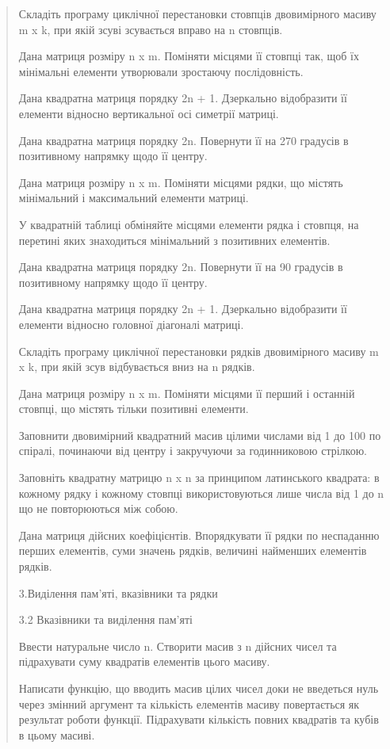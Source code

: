 \documentclass[]{article}
\begin{document}
\begin{quote}
Складіть програму циклічної перестановки стовпців двовимірного масиву m
x k, при якій зсуві зсувається вправо на n стовпців.

Дана матриця розміру n x m. Поміняти місцями її стовпці так, щоб їх
мінімальні елементи утворювали зростаючу послідовність.

Дана квадратна матриця порядку 2n + 1. Дзеркально відобразити її
елементи відносно вертикальної осі симетрії матриці.

Дана квадратна матриця порядку 2n. Повернути її на 270 градусів в
позитивному напрямку щодо її центру.

Дана матриця розміру n x m. Поміняти місцями рядки, що містять
мінімальний і максимальний елементи матриці.

У квадратній таблиці обміняйте місцями елементи рядка і стовпця, на
перетині яких знаходиться мінімальний з позитивних елементів.

Дана квадратна матриця порядку 2n. Повернути її на 90 градусів в
позитивному напрямку щодо її центру.

Дана квадратна матриця порядку 2n + 1. Дзеркально відобразити її
елементи відносно головної діагоналі матриці.

Складіть програму циклічної перестановки рядків двовимірного масиву m x
k, при якій зсув відбувається вниз на n рядків.

Дана матриця розміру n x m. Поміняти місцями її перший і останній
стовпці, що містять тільки позитивні елементи.

Заповнити двовимірний квадратний масив цілими числами від 1 до 100 по
спіралі, починаючи від центру і закручуючи за годинниковою стрілкою.

Заповніть квадратну матрицю n x n за принципом латинського квадрата: в
кожному рядку і кожному стовпці використовуються лише числа від 1 до n
що не повторюються між собою.

Дана матриця дійсних коефіцієнтів. Впорядкувати її рядки по неспаданню
перших елементів, суми значень рядків, величині найменших елементів
рядків.

3.Виділення пам'яті, вказівники та рядки

3.2 Вказівники та виділення пам'яті

Ввести натуральне число n. Створити масив з n дійсних чисел та
підрахувати суму квадратів елементів цього масиву.

Написати функцію, що вводить масив цілих чисел доки не введеться нуль
через змінний аргумент та кількість елементів масиву повертається як
результат роботи функції. Підрахувати кількість повних квадратів та
кубів в цьому масиві.


\end{quote}
\end{document}
